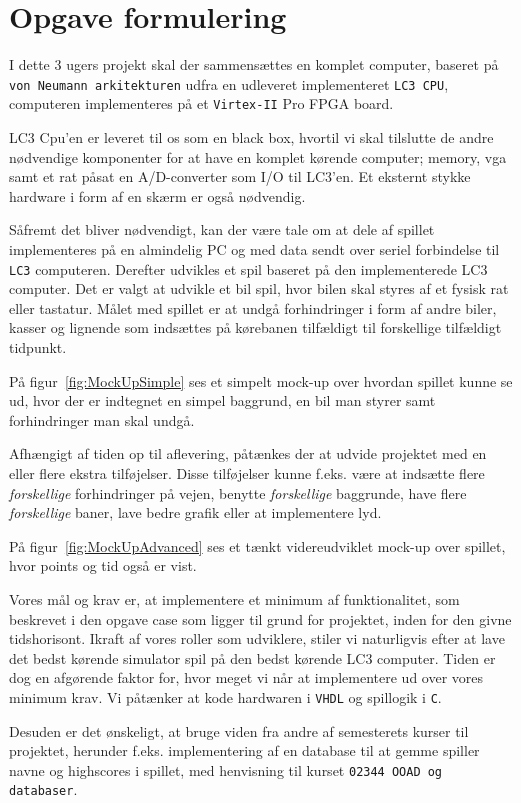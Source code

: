 \chapter{Opgave formulering}
I dette 3 ugers projekt skal der sammensættes en komplet computer, baseret på \texttt{von Neumann arkitekturen} udfra en udleveret implementeret \texttt{LC3 CPU}, computeren implementeres på et \texttt{Virtex-II} Pro FPGA board.

LC3 Cpu’en er leveret til os som en black box, hvortil vi skal tilslutte de andre nødvendige komponenter for at have en komplet kørende computer; memory, vga samt et rat påsat en A/D-converter som I/O til LC3’en. Et eksternt stykke hardware i form af en skærm er også nødvendig.

Såfremt det bliver nødvendigt, kan der være tale om at dele af spillet implementeres på en almindelig PC og med data sendt over seriel forbindelse til \texttt{LC3} computeren. 
Derefter udvikles et spil baseret på den implementerede LC3 computer. Det er valgt at udvikle et bil spil, hvor bilen skal styres af et fysisk rat eller tastatur. Målet med spillet er at undgå forhindringer i form af andre biler, kasser og lignende som indsættes på kørebanen tilfældigt til forskellige tilfældigt tidpunkt.

På figur~\vref{fig:MockUpSimple} ses et simpelt mock-up over hvordan spillet kunne se ud, hvor der er indtegnet en simpel baggrund, en bil man styrer samt forhindringer man skal undgå.


Afhængigt af tiden op til aflevering, påtænkes der at udvide projektet med en eller flere ekstra tilføjelser. Disse tilføjelser kunne f.eks. være at indsætte flere \textit{forskellige} forhindringer på vejen, benytte \textit{forskellige} baggrunde, have flere \textit{forskellige} baner, lave bedre grafik eller at implementere lyd.

På figur~\vref{fig:MockUpAdvanced} ses et tænkt videreudviklet mock-up over spillet, hvor points og tid også er vist.


Vores mål og krav er, at implementere et minimum af funktionalitet, som beskrevet i den opgave case som ligger til grund for projektet, inden for den givne tidshorisont. Ikraft af vores roller som udviklere, stiler vi naturligvis efter at lave det bedst kørende simulator spil på den bedst kørende LC3 computer. Tiden er dog en afgørende faktor for, hvor meget vi når at implementere ud over vores minimum krav.
Vi påtænker at kode hardwaren i \texttt{VHDL} og spillogik i \texttt{C}.

Desuden er det ønskeligt, at bruge viden fra andre af semesterets kurser til projektet, herunder f.eks. implementering af en database til at gemme spiller navne og highscores i spillet, med henvisning til kurset \texttt{02344 OOAD og databaser}.


